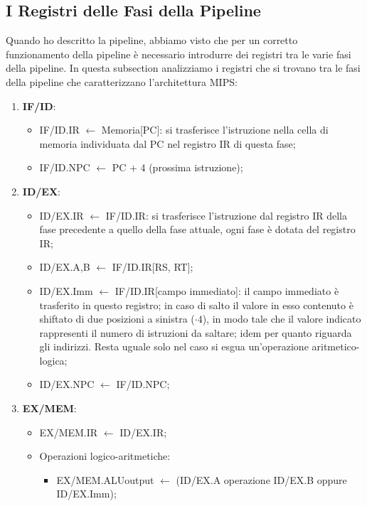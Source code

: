 \documentclass{article}
\begin{document}
\subsection{I Registri delle Fasi della Pipeline}
Quando ho descritto la pipeline, abbiamo visto che per un corretto funzionamento della pipeline è necessario introdurre dei registri tra le varie fasi della pipeline. In questa subsection analizziamo i registri che si trovano tra le fasi della pipeline che caratterizzano l'architettura MIPS:
\begin{enumerate}
	\item \textbf{IF/ID}:
		\begin{itemize}
			\item IF/ID.IR $\leftarrow$ Memoria[PC]: si trasferisce l'istruzione nella cella di memoria individuata dal PC nel registro IR di questa fase;
			\item IF/ID.NPC $\leftarrow$ PC + 4 (prossima istruzione);
		\end{itemize}

	\item \textbf{ID/EX}:
		\begin{itemize}
			\item ID/EX.IR $\leftarrow$ IF/ID.IR: si trasferisce l'istruzione dal registro IR della fase precedente a quello della fase attuale, ogni fase è dotata del registro IR;

			\item ID/EX.A,B $\leftarrow$ IF/ID.IR[RS, RT];

			\item ID/EX.Imm $\leftarrow$ IF/ID.IR[campo immediato]: il campo immediato è trasferito in questo registro; in caso di salto il valore in esso contenuto è shiftato di due posizioni a sinistra ($\cdot 4$), in modo tale che il valore indicato rappresenti il numero di istruzioni da saltare; idem per quanto riguarda gli indirizzi. Resta uguale solo nel caso si esgua un'operazione aritmetico-logica;

			\item ID/EX.NPC $\leftarrow$ IF/ID.NPC;
		\end{itemize}

	\item \textbf{EX/MEM}:
		\begin{itemize}
			\item EX/MEM.IR $\leftarrow$ ID/EX.IR;

			\item Operazioni logico-aritmetiche:
				\begin{itemize}
					\item EX/MEM.ALUoutput $\leftarrow$ (ID/EX.A operazione ID/EX.B oppure ID/EX.Imm);
				\end{itemize}


\end{itemize}
\end{enumerate}
\end{document}
